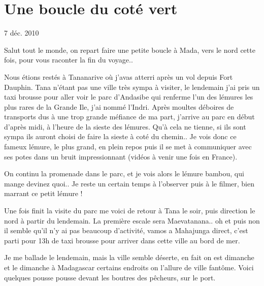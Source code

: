 \section{Une boucle du coté vert}

7 déc. 2010

\begin{multicols}{2}

Salut tout le monde, on repart faire une petite boucle à Mada, vers le nord cette fois, pour vous raconter la fin du voyage..

Nous étions restés à Tananarive où j'avas atterri après un vol depuis Fort Dauphin. Tana n'étant pas une ville très sympa à visiter, le lendemain j'ai pris un taxi brousse pour aller voir le parc d'Andasibe qui renferme l'un des lémures les plus rares de la Grande Ile, j'ai nommé l'Indri. Après moultes déboires de transports dus à une trop grande méfiance de ma part, j'arrive au parc en début d'après midi, à l'heure de la sieste des lémures. Qu'à cela ne tienne, si ils sont sympa ils auront choisi de faire la sieste à coté du chemin.. Je vois donc ce fameux lémure, le plus grand, en plein repos puis il se met à communiquer avec ses potes dans un bruit impressionnant (vidéos à venir une fois en France).


On continu la promenade dans le parc, et je vois alors le lémure bambou, qui mange devinez quoi.. Je reste un certain temps à l'observer puis à le filmer, bien marrant ce petit lémure !


Une fois finit la visite du parc me voici de retour à Tana le soir, puis direction le nord à partir du lendemain. La première escale sera Maevatanana.. oh et puis non il semble qu'il n'y ai pas beaucoup d'activité, vamos a Mahajunga direct, c'est parti pour 13h de taxi brousse pour arriver dans cette ville au bord de mer.

Je me ballade le lendemain, mais la ville semble déserte, en fait on est dimanche et le dimanche à Madagascar certains endroits on l'allure de ville fantôme. Voici quelques pousse pousse devant les boutres des pêcheurs, sur le port.



\end{multicols}
